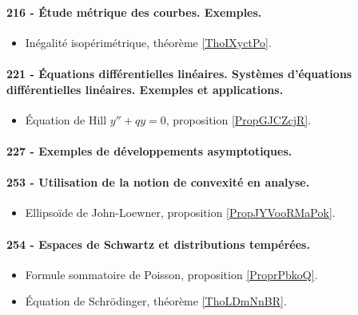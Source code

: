 \paragraph{216 - Étude métrique des courbes. Exemples.}
\begin{itemize}
    \item Inégalité isopérimétrique, théorème \ref{ThoIXyctPo}.
\end{itemize}
\paragraph{221 - Équations différentielles linéaires. Systèmes d’équations différentielles linéaires. Exemples et applications.}
\begin{itemize}
    \item Équation de Hill \( y''+qy=0\), proposition \ref{PropGJCZcjR}.
\end{itemize}
\paragraph{227 - Exemples de développements asymptotiques.}
\paragraph{253 - Utilisation de la notion de convexité en analyse.}
\begin{itemize}
    \item Ellipsoïde de John-Loewner, proposition \ref{PropJYVooRMaPok}.
\end{itemize}
\paragraph{254 - Espaces de Schwartz et distributions tempérées.}
\begin{itemize}
    \item Formule sommatoire de Poisson, proposition \ref{ProprPbkoQ}.
    \item Équation de Schrödinger, théorème \ref{ThoLDmNnBR}.
\end{itemize}
